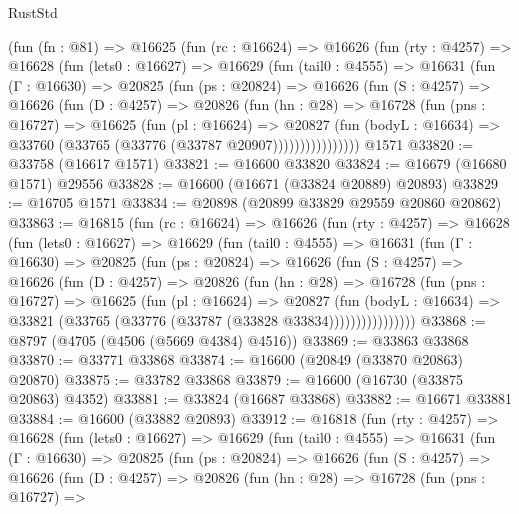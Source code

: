 \begin{lexlean}{RustStd}
\begin{coremodule}
{\begin{coremodule}
{{{{{{{{{{{{{{{{{{{{{{{{{{{{{{{{{{{{{{{{{{{{{{{{{{{{{{{    (fun (fn : @81) =>
    @16625
      (fun (rc : @16624) =>
      @16626
        (fun (rty : @4257) =>
        @16628
          (fun (lets0 : @16627) =>
          @16629
            (fun (tail0 : @4555) =>
            @16631
              (fun (Γ : @16630) =>
              @20825
                (fun (ps : @20824) =>
                @16626
                  (fun (S : @4257) =>
                  @16626
                    (fun (D : @4257) =>
                    @20826
                      (fun (hn : @28) =>
                      @16728
                        (fun (pns : @16727) =>
                        @16625
                          (fun (pl : @16624) =>
                          @20827
                            (fun (bodyL : @16634) =>
                            @33760 (@33765 (@33776 (@33787 @20907))))))))))))))))
    @1571
@33820 := @33758 (@16617 @1571)
@33821 := @16600 @33820
@33824 := @16679 (@16680 @1571) @29556
@33828 := @16600 (@16671 (@33824 @20889) @20893)
@33829 := @16705 @1571
@33834 := @20898 (@20899 @33829 @29559 @20860 @20862)
@33863 := @16815
    (fun (rc : @16624) =>
    @16626
      (fun (rty : @4257) =>
      @16628
        (fun (lets0 : @16627) =>
        @16629
          (fun (tail0 : @4555) =>
          @16631
            (fun (Γ : @16630) =>
            @20825
              (fun (ps : @20824) =>
              @16626
                (fun (S : @4257) =>
                @16626
                  (fun (D : @4257) =>
                  @20826
                    (fun (hn : @28) =>
                    @16728
                      (fun (pns : @16727) =>
                      @16625
                        (fun (pl : @16624) =>
                        @20827
                          (fun (bodyL : @16634) =>
                          @33821 (@33765 (@33776 (@33787 (@33828 @33834))))))))))))))))
@33868 := @8797 (@4705 (@4506 (@5669 @4384) @4516))
@33869 := @33863 @33868
@33870 := @33771 @33868
@33874 := @16600 (@20849 (@33870 @20863) @20870)
@33875 := @33782 @33868
@33879 := @16600 (@16730 (@33875 @20863) @4352)
@33881 := @33824 (@16687 @33868)
@33882 := @16671 @33881
@33884 := @16600 (@33882 @20893)
@33912 := @16818
    (fun (rty : @4257) =>
    @16628
      (fun (lets0 : @16627) =>
      @16629
        (fun (tail0 : @4555) =>
        @16631
          (fun (Γ : @16630) =>
          @20825
            (fun (ps : @20824) =>
            @16626
              (fun (S : @4257) =>
              @16626
                (fun (D : @4257) =>
                @20826
                  (fun (hn : @28) =>
                  @16728
                    (fun (pns : @16727) =>
}}}}}}}}}}}}}}}}}}}}}}}}}}}}}}}}}}}}}}}}}}}}}}}}}}}}}}}
\end{coremodule}}
\end{coremodule}
\end{lexlean}
